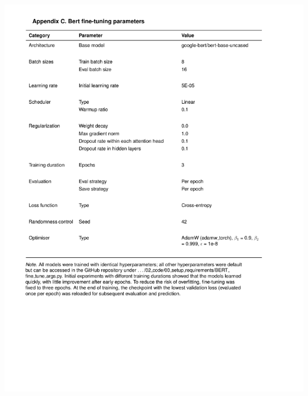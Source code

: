 \documentclass[
  12pt,
]{article}
\begin{document}
\begin{center}\includegraphics{../03_outputs/04_appendices/appendix_c} \end{center}
\end{document}
